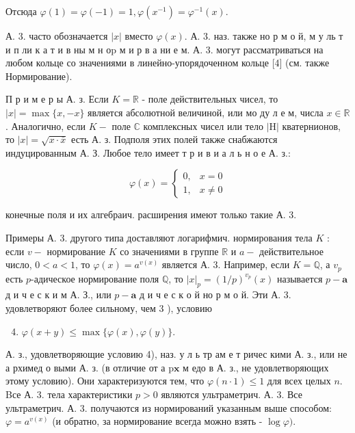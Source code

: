 \documentclass[10pt]{article}
\begin{document}
Отсюда $\varphi(1)=\varphi(-1)=1, \varphi\left(x^{-1}\right)=\varphi^{-1}(x)$.



А. 3. часто обозначается $|x|$ вместо $\varphi(x)$. А. 3. наз. также но р м о й, м у ль т и п ли к а т и в ны м н $о \mathrm{p}$ м и р в а ни е м. А. 3. могут рассматриваться на любом кольце со значениями в линейно-упорядоченном кольце [4] (см. также Нормирование).



П р и м е р ы А. з. Если $K=\mathbb{R}$ - поле действительных чисел, то $|x|=\max \{x,-x\}$ является абсолютной величиной, или мо ду л е м, числа $x \in \mathbb{R}$. Аналогично, если $K-$ поле $\mathbb{C}$ комплексных чисел или тело $|\mathrm{H}|$ кватернионов, то $|x|=\sqrt{x \cdot \bar{x}}$ есть А. з. Подполя этих полей также снабжаются индуцированным А. З. Любое тело имеет т р и в и а л ь н о е А. з.:



\[

\varphi(x)= \begin{cases}0, & x=0 \\ 1, & x \neq 0\end{cases}

\]



конечные поля и их алгебраич. расширения имеют только такие А. 3.



Примеры А. 3. другого типа доставляют логарифмич. нормирования тела $K$ : если $v-$ нормирование $K$ со значениями в группе $\mathbb{R}$ и $a-$ действительное число, $0<a<1$, то $\varphi(x)=a^{v(x)}$ является А. 3. Например, если $K=\mathbb{Q}$, а $v_{p}$ есть $p$-адическое нормирование поля $\mathbb{Q}$, то $|x|_{p}=(1 / p)^{v_{p}}(x)$ называется $p-\mathbf{a}$ д и ч е с к и м А. З., или $p-\mathbf{a}$ д и ч е с к о й но р м о й. Эти А. 3. удовлетворяют более сильному, чем 3 ), условию



\begin{enumerate}

  \setcounter{enumi}{3}

  \item $\varphi(x+y) \leqslant \max \{\varphi(x), \varphi(y)\}$.

\end{enumerate}



А. з., удовлетворяющие условию 4), наз. у л ь тр ам е т ричес кими А. з., или не а рхимед о выми А. з. (в отличие от а $\mathrm{p} \mathbf{x}$ м едо в А. з., не удовлетворяющих этому условию). Они характеризуются тем, что $\varphi(n \cdot 1) \leqslant 1$ для всех целых $n$. Bсе А. 3. тела характеристики $p>0$ являются ультраметрич. А. 3. Все ультраметрич. А. 3. получаются из нормирований указанным выше способом: $\varphi=a^{v(x)}$ (и обратно, за нормирование всегда можно взять - $\log \varphi)$.
\end{document}
